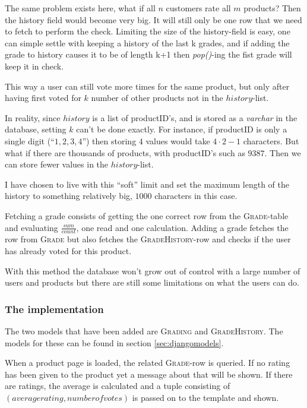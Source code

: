 \documentclass[12pt, a4paper,titlepage]{article}
\begin{document}
The same problem exists here, what if all $n$ customers rate all $m$ products?
Then the history field would become very big. It will still only be one row that
we need to fetch to perform the check.
Limiting the size of the history-field is easy, one can simple settle with keeping
a history of the last k grades, and if adding the grade to history causes it to be
of length k+1 then \emph{pop()}-ing the fist grade will keep it in check. 

This way a user can still vote more times for the same product, but
only after having first voted for $k$ number of other products not in the
 $history$-list. 

In reality, since $history$ is a list of productID's, and is stored as a 
\emph{varchar} in the database, setting $k$ can't be done exactly.
For instance, if productID is only a single digit (``$1,2,3,4$'') then storing 
$4$ values would take $4\cdot 2 - 1$ characters. But what if there are
thousands of products, with productID's such as $9387$. Then we can store
fewer values in the $history$-list.

I have chosen to live with this ``soft'' limit and set the maximum length of
the history to something relatively big, $1000$ characters in this case.

Fetching a grade consists of getting the  one correct row from the 
\textsc{Grade}-table and evaluating $\frac{sum}{count}$, one read and one
calculation.
Adding a grade fetches the row from \textsc{Grade} but also fetches the \textsc{GradeHistory}-row and checks if the user has already
voted for this product.

With this method the database won't grow out of control with a large number 
of users and products but there are still some limitations on what the users 
can do.

\subsubsection{The implementation}
The two models that have been added are \textsc{Grading} and 
\textsc{GradeHistory}. The models for these can be found in section
 \ref{sec:djangomodels}.

When a product page is loaded, the related \textsc{Grade}-row is queried.
If no rating has been given to the product yet a message about that will be
shown. If there are ratings, the average is calculated and a tuple consisting of
$(average rating, number of votes)$ is passed on to the template and shown.
\end{document}
